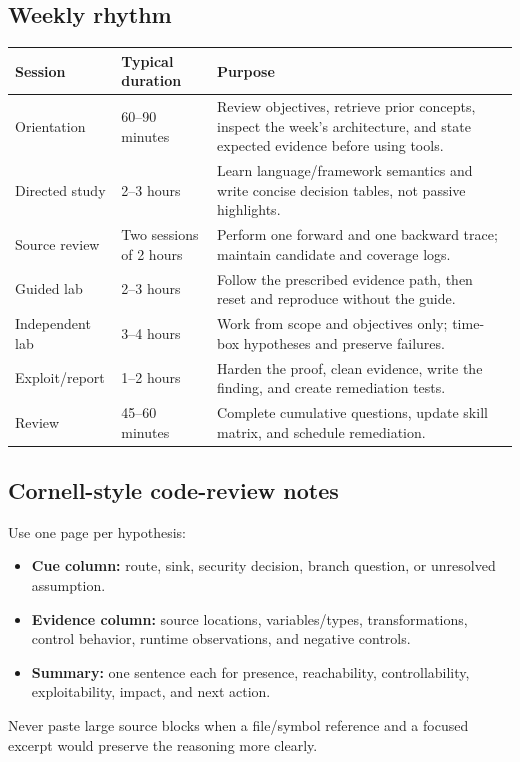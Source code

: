 \documentclass[11pt]{article}
\begin{document}
\subsection{Weekly rhythm}
\begin{longtable}{@{}L{0.15\textwidth}L{0.22\textwidth}L{0.52\textwidth}@{}}
\toprule
\textbf{Session} & \textbf{Typical duration} & \textbf{Purpose} \\
\midrule
\endhead
Orientation & 60--90 minutes & Review objectives, retrieve prior concepts, inspect the week's architecture, and state expected evidence before using tools. \\
Directed study & 2--3 hours & Learn language/framework semantics and write concise decision tables, not passive highlights. \\
Source review & Two sessions of 2 hours & Perform one forward and one backward trace; maintain candidate and coverage logs. \\
Guided lab & 2--3 hours & Follow the prescribed evidence path, then reset and reproduce without the guide. \\
Independent lab & 3--4 hours & Work from scope and objectives only; time-box hypotheses and preserve failures. \\
Exploit/report & 1--2 hours & Harden the proof, clean evidence, write the finding, and create remediation tests. \\
Review & 45--60 minutes & Complete cumulative questions, update skill matrix, and schedule remediation. \\
\bottomrule
\end{longtable}

\subsection{Cornell-style code-review notes}
Use one page per hypothesis:
\begin{itemize}
  \item \textbf{Cue column:} route, sink, security decision, branch question, or unresolved assumption.
  \item \textbf{Evidence column:} source locations, variables/types, transformations, control behavior, runtime observations, and negative controls.
  \item \textbf{Summary:} one sentence each for presence, reachability, controllability, exploitability, impact, and next action.
\end{itemize}
Never paste large source blocks when a file/symbol reference and a focused excerpt
would preserve the reasoning more clearly.
\end{document}
